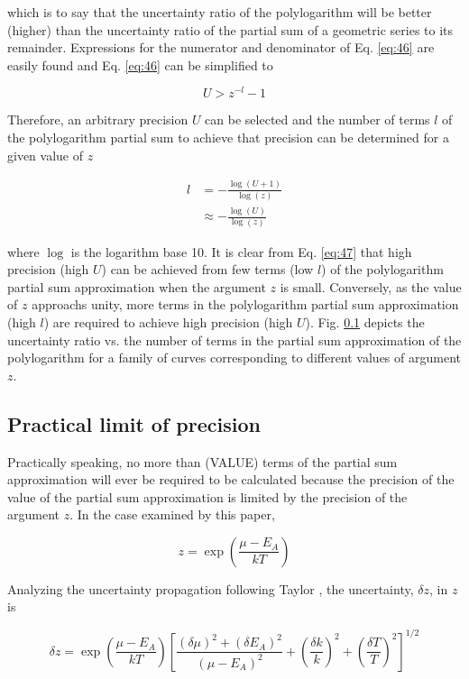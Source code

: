 \documentclass[letterpaper,12pt]{article}
\begin{document}
\noindent which is to say that the uncertainty ratio of the polylogarithm will be better (higher) than the uncertainty ratio of the partial sum of a geometric series to its remainder. Expressions for the numerator and denominator of Eq. \ref{eq:46} are easily found and Eq. \ref{eq:46} can be simplified to

\begin{equation} \label{eq:47}
U > z^{-l} - 1
\end{equation}

\noindent Therefore, an arbitrary precision $U$ can be selected and the number of terms $l$ of the polylogarithm partial sum to achieve that precision can be determined for a given value of $z$

\begin{align} \label{eq:48}
l &= -\frac{\log(U+ 1)}{\log(z)} \\
 &\approx -\frac{\log(U)}{\log(z)}
\end{align}

\noindent where $\log$ is the logarithm base 10. It is clear from Eq. \ref{eq:47} that high precision (high $U$) can be achieved from few terms (low $l$) of the polylogarithm partial sum approximation when the argument $z$ is small. Conversely, as the value of $z$ approachs unity, more terms in the polylogarithm partial sum approximation (high $l$) are required to achieve high precision (high $U$). Fig. \ref{} depicts the uncertainty ratio vs. the number of terms in the partial sum approximation of the polylogarithm for a family of curves corresponding to different values of argument $z$.

\subsection{Practical limit of precision}
Practically speaking, no more than (VALUE) terms of the partial sum approximation will ever be required to be calculated because the precision of the value of the partial sum approximation is limited by the precision of the argument $z$. In the case examined by this paper, 

\begin{equation} \label{eq:49}
z = \exp \left( \frac{\mu - E_{A}}{kT} \right)
\end{equation}

Analyzing the uncertainty propagation following Taylor \cite{9780935702422}, the uncertainty, $\delta z$, in $z$ is

\begin{equation} \label{eq:50}
\delta z = \exp \left( \frac{\mu - E_{A}}{kT} \right) \left[\frac{(\delta \mu)^{2} + (\delta E_{A})^{2}}{(\mu - E_{A})^{2}} + \left( \frac{\delta k}{k} \right)^{2} + \left( \frac{\delta T}{T} \right)^{2} \right]^{1/2}
\end{equation}
\end{document}
